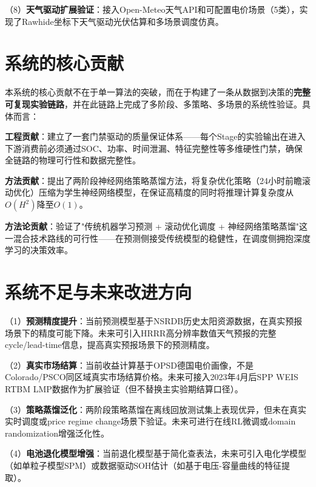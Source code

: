 \documentclass[12pt,a4paper]{ctexbook}
\begin{document}
（8）\textbf{天气驱动扩展验证}：接入Open-Meteo天气API和可配置电价场景（5类），实现了Rawhide坐标下天气驱动光伏估算和多场景调度仿真。\cite{open-meteo-2023,rawhide-nrel}

\section{系统的核心贡献}

本系统的核心贡献不在于单一算法的突破，而在于构建了一条从数据到决策的\textbf{完整可复现实验链路}，并在此链路上完成了多阶段、多策略、多场景的系统性验证。具体而言：

\textbf{工程贡献}：建立了一套门禁驱动的质量保证体系——每个Stage的实验输出在进入下游消费前必须通过SOC、功率、时间泄漏、特征完整性等多维硬性门禁，确保全链路的物理可行性和数据完整性。

\textbf{方法贡献}：提出了两阶段神经网络策略蒸馏方法，将复杂优化策略（24小时前瞻滚动优化）压缩为学生神经网络模型，在保证高精度的同时将推理计算复杂度从$O(H^2)$降至$O(1)$。\cite{policy-distillation-2016,bo-two-stage-rolling-2025,li-mpc-microgrid-2025}

\textbf{方法论贡献}：验证了"传统机器学习预测 + 滚动优化调度 + 神经网络策略蒸馏"这一混合技术路线的可行性——在预测侧接受传统模型的稳健性，在调度侧拥抱深度学习的决策效率。\cite{lightgbm-2017,bo-two-stage-rolling-2025,li-mpc-microgrid-2025,policy-distillation-2016}

\section{系统不足与未来改进方向}

（1）\textbf{预测精度提升}：当前预测模型基于NSRDB历史太阳资源数据，在真实预报场景下的精度可能下降。未来可引入HRRR高分辨率数值天气预报的完整cycle/lead-time信息，提高真实预报场景下的预测精度。\cite{nsrdb-nrel}

（2）\textbf{真实市场结算}：当前收益计算基于OPSD德国电价画像，不是Colorado/PSCO同区域真实市场结算价格。未来可接入2023年4月后SPP WEIS RTBM LMP数据作为扩展验证（但不替换主实验期结算口径）。\cite{opsd-datapackage-2020,opsd-wiese-2019}

（3）\textbf{策略蒸馏泛化}：两阶段策略蒸馏在离线回放测试集上表现优异，但未在真实实时调度或price regime change场景下验证。未来可进行在线RL微调或domain randomization增强泛化性。\cite{policy-distillation-2016}

（4）\textbf{电池退化模型增强}：当前退化模型基于简化查表法，未来可引入电化学模型（如单粒子模型SPM）或数据驱动SOH估计（如基于电压-容量曲线的特征提取）。\cite{battery-degradation-review-2021}
\end{document}
